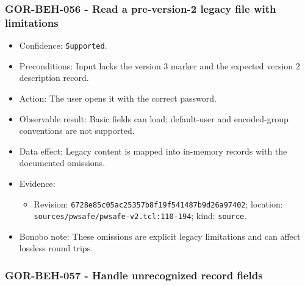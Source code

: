 \documentclass[
  letterpaper,
]{article}
\newcommand{\passthrough}[1]{#1}
\providecommand{\tightlist}{%
  \setlength{\itemsep}{0pt}\setlength{\parskip}{0pt}}
\begin{document}
\subsubsection{GOR-BEH-056 - Read a pre-version-2 legacy file with
limitations}\label{gor-beh-056---read-a-pre-version-2-legacy-file-with-limitations}

\begin{itemize}
\tightlist
\item
  Confidence: \passthrough{\lstinline!Supported!}.
\item
  Preconditions: Input lacks the version 3 marker and the expected version 2 description record.
\item
  Action: The user opens it with the correct password.
\item
  Observable result: Basic fields can load; default-user and encoded-group conventions are not supported.
\item
  Data effect: Legacy content is mapped into in-memory records with the documented omissions.
\item
  Evidence:

  \begin{itemize}
  \tightlist
  \item
    Revision: \nolinkurl{6728e85c05ac25357b8f19f541487b9d26a97402}; location:
    \nolinkurl{sources/pwsafe/pwsafe-v2.tcl:110-194}; kind: \passthrough{\lstinline!source!}.
  \end{itemize}
\item
  Bonobo note: These omissions are explicit legacy limitations and can affect lossless round trips.
\end{itemize}

\subsubsection{GOR-BEH-057 - Handle unrecognized record fields}\label{gor-beh-057---handle-unrecognized-record-fields}
\end{document}
